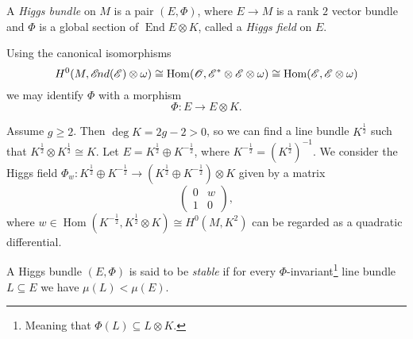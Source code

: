 \documentclass[A4paper, 12pt, british, reqno]{amsart}
\DeclareMathOperator{\Hom}{Hom}
\DeclareMathOperator{\End}{End}
\newcommand{\ot}{\otimes}
\newcommand{\op}{\oplus}
\newcommand{\dual}{^{*}}
\begin{document}
%
%
%

\begin{defn}
    A \textit{Higgs bundle} on $M$ is a pair $(E,\Phi)$, where $E\to M$ is a rank $2$ vector bundle and $\Phi$ is a global section of $\End{E}\ot K$, called a \textit{Higgs field} on $E$.
\end{defn}

\begin{rem}
    Using the canonical isomorphisms
    \[ H^{0}(M,\sEnd(\E)\ot \w)\cong \Hom(\O,\E\dual \ot \E\ot \w)\cong \Hom(\E,\E\ot \w) \]
    we may identify $\Phi$ with a morphism
    \[ \Phi\colon E\to E\ot K. \]
\end{rem}


\begin{exa}
    Assume $g\geqslant 2$.
    Then $\deg{K}=2g-2>0$, so we can find a line bundle $K^{\frac{1}{2}}$ such that $K^{\frac{1}{2}}\ot K^{\frac{1}{2}}\cong K$.
    Let $E=K^{\frac{1}{2}}\op K^{-\frac{1}{2}}$, where $K^{-\frac{1}{2}}=(K^{\frac{1}{2}})^{-1}$.
    We consider the Higgs field $\Phi_{w}\colon K^{\frac{1}{2}}\op K^{-\frac{1}{2}}\to (K^{\frac{1}{2}}\op K^{-\frac{1}{2}})\ot K$ given by a matrix
    \[
	\begin{pmatrix}
	    0 & w \\
	    1 & 0
	\end{pmatrix},
    \]
    where $w\in \Hom(K^{-\frac{1}{2}},K^{\frac{1}{2}}\ot K)\cong H^{0}(M,K^{2})$ can be regarded as a quadratic differential.
\end{exa}

\begin{defn}[Stability]
A Higgs bundle $(E,\Phi)$ is said to be \textit{stable} if for every $\Phi$-invariant\footnote{Meaning that $\Phi(L)\subseteq L\ot K$.} line bundle $L\subseteq E$ we have $\mu(L)<\mu(E)$.
\end{defn}
\end{document}

